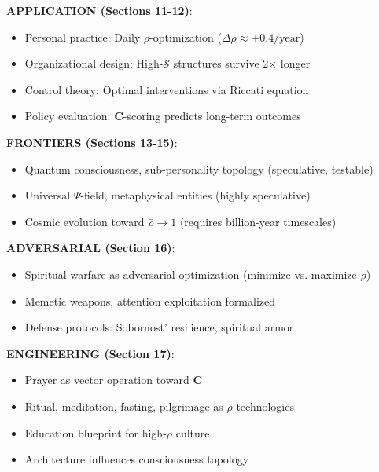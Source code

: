 \documentclass[11pt,a4paper]{article}
\theoremstyle{definition}
\theoremstyle{remark}
\begin{document}
\begin{small}
\begin{enumerate}
\begin{protocol}
\begin{mdframed}[backgroundcolor=blue!5,linewidth=2pt]
\textbf{APPLICATION (Sections 11-12)}:
\begin{itemize}[nosep]
    \item Personal practice: Daily \(\rho\)-optimization (\(\Delta\rho \approx +0.4/\text{year}\))
    \item Organizational design: High-\(\mathcal{S}\) structures survive 2× longer
    \item Control theory: Optimal interventions via Riccati equation
    \item Policy evaluation: \(\mathbf{C}\)-scoring predicts long-term outcomes
\end{itemize}

\textbf{FRONTIERS (Sections 13-15)}:
\begin{itemize}[nosep]
    \item Quantum consciousness, sub-personality topology (speculative, testable)
    \item Universal \(\Psi\)-field, metaphysical entities (highly speculative)
    \item Cosmic evolution toward \(\bar{\rho} \to 1\) (requires billion-year timescales)
\end{itemize}

\textbf{ADVERSARIAL (Section 16)}:
\begin{itemize}[nosep]
    \item Spiritual warfare as adversarial optimization (minimize vs. maximize \(\rho\))
    \item Memetic weapons, attention exploitation formalized
    \item Defense protocols: Sobornost' resilience, spiritual armor
\end{itemize}

\textbf{ENGINEERING (Section 17)}:
\begin{itemize}[nosep]
    \item Prayer as vector operation toward \(\mathbf{C}\)
    \item Ritual, meditation, fasting, pilgrimage as \(\rho\)-technologies
    \item Education blueprint for high-\(\rho\) culture
    \item Architecture influences consciousness topology
\end{itemize}
\end{mdframed}

\begin{figure}[H]
\centering
{}
\end{figure}
\end{protocol}
\end{enumerate}
\end{small}
\end{document}
